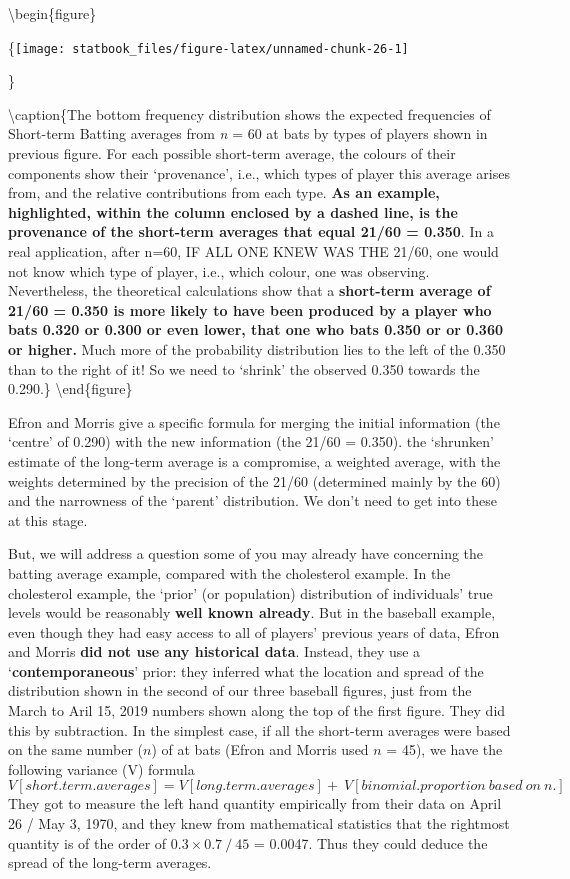 \documentclass[]{book}
\begin{document}
\textbackslash{}begin\{figure\}

\{\centering \texttt{[image: statbook\_files/figure-latex/unnamed-chunk-26-1]}

\}

\textbackslash{}caption\{The bottom frequency distribution shows the expected frequencies of Short-term Batting averages from \emph{n} = 60 at bats by types of players shown in previous figure. For each possible short-term average, the colours of their components show their `provenance', i.e., which types of player this average arises from, and the relative contributions from each type. \textbf{As an example, highlighted, within the column enclosed by a dashed line, is the provenance of the short-term averages that equal 21/60 = 0.350}. In a real application, after n=60, IF ALL ONE KNEW WAS THE 21/60, one would not know which type of player, i.e., which colour, one was observing. Nevertheless, the theoretical calculations show that a \textbf{short-term average of 21/60 = 0.350 is more likely to have been produced by a player who bats 0.320 or 0.300 or even lower, that one who bats 0.350 or or 0.360 or higher.} Much more of the probability distribution lies to the left of the 0.350 than to the right of it! So we need to `shrink' the observed 0.350 towards the 0.290.\}\label{fig:unnamed-chunk-26}
\textbackslash{}end\{figure\}

Efron and Morris give a specific formula for merging the initial information (the `centre' of 0.290) with the new information (the 21/60 = 0.350). the `shrunken' estimate of the long-term average is a compromise, a weighted average, with the weights determined by the precision of the 21/60 (determined mainly by the 60) and the narrowness of the `parent' distribution. We don't need to get into these at this stage.

But, we will address a question some of you may already have concerning the batting average example, compared with the cholesterol example. In the cholesterol example, the `prior' (or population) distribution of individuals' true levels would be reasonably \textbf{well known already}. But in the baseball example, even though they had easy access to all of players' previous years of data, Efron and Morris \textbf{did not use any historical data}. Instead, they use a `\textbf{contemporaneous}' prior: they inferred what the location and spread of the distribution shown in the second of our three baseball figures, just from the March to Aril 15, 2019 numbers shown along the top of the first figure. They did this by subtraction. In the simplest case, if all the short-term averages were based on the same number (\(n\)) of at bats (Efron and Morris used \(n\) = 45), we have the following variance (V) formula\\
\[V[short.term.averages] =  V[long.term.averages] +  \  V[binomial.proportion \ based \ on \ n.]\]
They got to measure the left hand quantity empirically from their data on April 26 / May 3, 1970, and they knew from mathematical statistics that the rightmost quantity is of the order of \(0.3 \times 0.7 \  / \ 45\) =
0.0047. Thus they could deduce the spread of the long-term averages.
\end{document}
